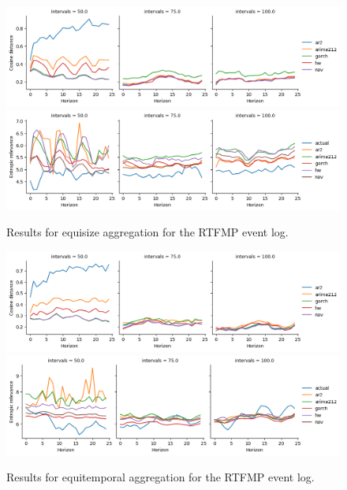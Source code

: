 \begin{figure}
    \centering
    \includegraphics[width=\textwidth]{img/rtfmp_cosine_small_equisize.png}
    \includegraphics[width=\textwidth]{img/rtfmp_entropic_small_equisize.png}
    \caption{Results for equisize aggregation for the RTFMP event log.}
    \label{fig:rtfmp_equisize}
\end{figure}

\begin{figure}
    \centering
    \includegraphics[width=\textwidth]{img/rtfmp_cosine_small_equitemp.png}
    \includegraphics[width=\textwidth]{img/rtfmp_entropic_small_equitemp.png}
    \caption{Results for equitemporal aggregation for the RTFMP event log.}
    \label{fig:rtfmp_equitemp}
\end{figure}

